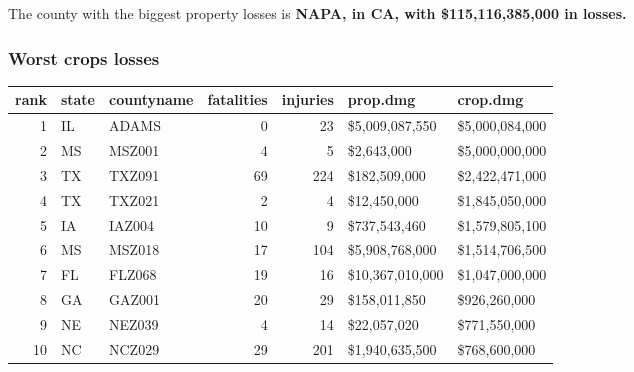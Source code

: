 \documentclass[]{article}
\newenvironment{Shaded}{\begin{snugshade}}{\end{snugshade}}
\newcommand{\KeywordTok}[1]{\textcolor[rgb]{0.13,0.29,0.53}{\textbf{{#1}}}}
\newcommand{\DataTypeTok}[1]{\textcolor[rgb]{0.13,0.29,0.53}{{#1}}}
\newcommand{\DecValTok}[1]{\textcolor[rgb]{0.00,0.00,0.81}{{#1}}}
\newcommand{\StringTok}[1]{\textcolor[rgb]{0.31,0.60,0.02}{{#1}}}
\newcommand{\CommentTok}[1]{\textcolor[rgb]{0.56,0.35,0.01}{\textit{{#1}}}}
\newcommand{\NormalTok}[1]{{#1}}
\begin{document}
The county with the biggest property losses is \textbf{NAPA, in CA, with
\$115,116,385,000 in losses.}

\subsubsection{Worst crops losses}\label{worst-crops-losses}

\begin{Shaded}
\end{Shaded}

\begin{longtable}[]{@{}rllrrll@{}}
\toprule
rank & state & countyname & fatalities & injuries & prop.dmg &
crop.dmg\tabularnewline
\midrule
\endhead
1 & IL & ADAMS & 0 & 23 & \$5,009,087,550 &
\$5,000,084,000\tabularnewline
2 & MS & MSZ001 & 4 & 5 & \$2,643,000 & \$5,000,000,000\tabularnewline
3 & TX & TXZ091 & 69 & 224 & \$182,509,000 &
\$2,422,471,000\tabularnewline
4 & TX & TXZ021 & 2 & 4 & \$12,450,000 & \$1,845,050,000\tabularnewline
5 & IA & IAZ004 & 10 & 9 & \$737,543,460 &
\$1,579,805,100\tabularnewline
6 & MS & MSZ018 & 17 & 104 & \$5,908,768,000 &
\$1,514,706,500\tabularnewline
7 & FL & FLZ068 & 19 & 16 & \$10,367,010,000 &
\$1,047,000,000\tabularnewline
8 & GA & GAZ001 & 20 & 29 & \$158,011,850 & \$926,260,000\tabularnewline
9 & NE & NEZ039 & 4 & 14 & \$22,057,020 & \$771,550,000\tabularnewline
10 & NC & NCZ029 & 29 & 201 & \$1,940,635,500 &
\$768,600,000\tabularnewline
\bottomrule
\end{longtable}
\end{document}
